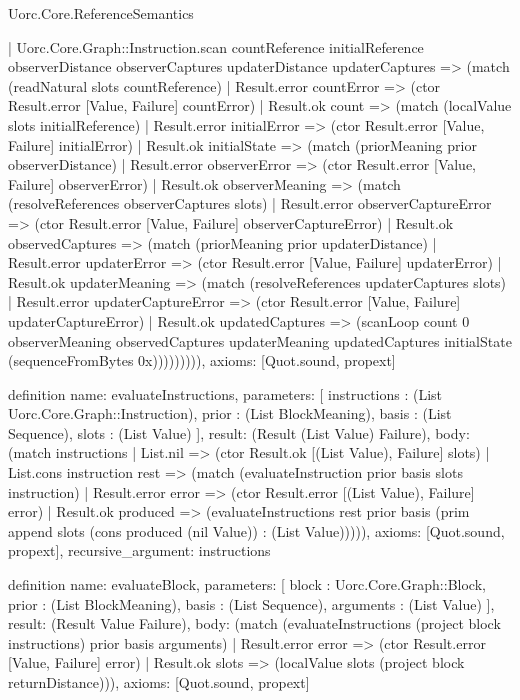 \begin{lexlean}{Uorc.Core.ReferenceSemantics}
\begin{semanticmodule}
{    | Uorc.Core.Graph::Instruction.scan countReference initialReference observerDistance observerCaptures updaterDistance updaterCaptures => (match (readNatural slots countReference)
      | Result.error countError => (ctor Result.error [Value, Failure] countError)
      | Result.ok count => (match (localValue slots initialReference)
        | Result.error initialError => (ctor Result.error [Value, Failure] initialError)
        | Result.ok initialState => (match (priorMeaning prior observerDistance)
          | Result.error observerError => (ctor Result.error [Value, Failure] observerError)
          | Result.ok observerMeaning => (match (resolveReferences observerCaptures slots)
            | Result.error observerCaptureError => (ctor Result.error [Value, Failure] observerCaptureError)
            | Result.ok observedCaptures => (match (priorMeaning prior updaterDistance)
              | Result.error updaterError => (ctor Result.error [Value, Failure] updaterError)
              | Result.ok updaterMeaning => (match (resolveReferences updaterCaptures slots)
                | Result.error updaterCaptureError => (ctor Result.error [Value, Failure] updaterCaptureError)
                | Result.ok updatedCaptures => (scanLoop count 0 observerMeaning observedCaptures updaterMeaning updatedCaptures initialState (sequenceFromBytes 0x))))))))),
  axioms: [Quot.sound, propext]
}

definition{
  name: evaluateInstructions,
  parameters: [
    instructions : (List Uorc.Core.Graph::Instruction),
    prior : (List BlockMeaning),
    basis : (List Sequence),
    slots : (List Value)
  ],
  result: (Result (List Value) Failure),
  body: (match instructions
    | List.nil => (ctor Result.ok [(List Value), Failure] slots)
    | List.cons instruction rest => (match (evaluateInstruction prior basis slots instruction)
      | Result.error error => (ctor Result.error [(List Value), Failure] error)
      | Result.ok produced => (evaluateInstructions rest prior basis (prim append slots (cons produced (nil Value)) : (List Value))))),
  axioms: [Quot.sound, propext],
  recursive_argument: instructions
}

definition{
  name: evaluateBlock,
  parameters: [
    block : Uorc.Core.Graph::Block,
    prior : (List BlockMeaning),
    basis : (List Sequence),
    arguments : (List Value)
  ],
  result: (Result Value Failure),
  body: (match (evaluateInstructions (project block instructions) prior basis arguments)
    | Result.error error => (ctor Result.error [Value, Failure] error)
    | Result.ok slots => (localValue slots (project block returnDistance))),
  axioms: [Quot.sound, propext]
}


\end{semanticmodule}
\end{lexlean}
